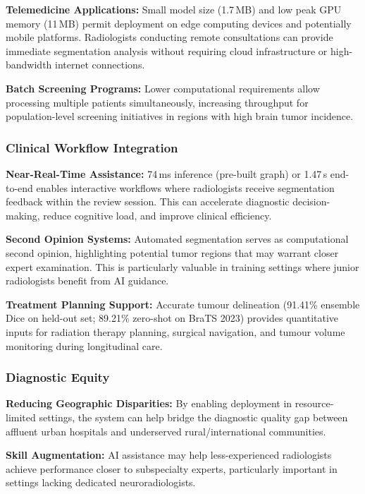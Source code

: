 \textbf{Telemedicine Applications:} Small model size (1.7\,MB) and low peak GPU memory (11\,MB) permit deployment on edge computing devices and potentially mobile platforms. Radiologists conducting remote consultations can provide immediate segmentation analysis without requiring cloud infrastructure or high-bandwidth internet connections.

\textbf{Batch Screening Programs:} Lower computational requirements allow processing multiple patients simultaneously, increasing throughput for population-level screening initiatives in regions with high brain tumor incidence.

\subsubsection{Clinical Workflow Integration}

\textbf{Near-Real-Time Assistance:} 74\,ms inference (pre-built graph) or 1.47\,s end-to-end enables interactive workflows where radiologists receive segmentation feedback within the review session. This can accelerate diagnostic decision-making, reduce cognitive load, and improve clinical efficiency.

\textbf{Second Opinion Systems:} Automated segmentation serves as computational second opinion, highlighting potential tumor regions that may warrant closer expert examination. This is particularly valuable in training settings where junior radiologists benefit from AI guidance.

\textbf{Treatment Planning Support:} Accurate tumour delineation (91.41\% ensemble Dice on held-out set; 89.21\% zero-shot on BraTS 2023) provides quantitative inputs for radiation therapy planning, surgical navigation, and tumour volume monitoring during longitudinal care.

\subsubsection{Diagnostic Equity}

\textbf{Reducing Geographic Disparities:} By enabling deployment in resource-limited settings, the system can help bridge the diagnostic quality gap between affluent urban hospitals and underserved rural/international communities.

\textbf{Skill Augmentation:} AI assistance may help less-experienced radiologists achieve performance closer to subspecialty experts, particularly important in settings lacking dedicated neuroradiologists.

